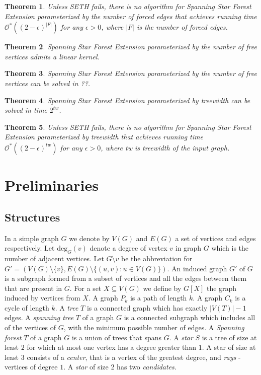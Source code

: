 \documentclass[en]{pracamgr}
\newtheorem{theorem}{Theorem}
\newcommand{\ssfep}{{\sc Spanning Star Forest Extension}}
\newcommand{\degree}[2]{\textrm{deg}_{#1}(#2)}
\begin{document}
\begin{theorem}
	Unless SETH fails, there is no algorithm for \ssfep{} parameterized by the number of forced edges that achieves running time $\mathcal{O}^*((2-\epsilon)^{|F|})$ for any $\epsilon > 0$, where $|F|$ is the number of forced edges.
\end{theorem}

\begin{theorem}
	\ssfep{} parameterized by the number of free vertices admits a linear kernel.
\end{theorem}

\begin{theorem}
	\ssfep{} parameterized by the number of free vertices can be solved in ??.%
\end{theorem}

\begin{theorem}
	\ssfep{} parameterized by treewidth can be solved in time $2^{tw}$.
\end{theorem}

\begin{theorem}
	Unless SETH fails, there is no algorithm for \ssfep{} parameterized by treewidth that achieves running time $\mathcal{O}^*((2-\epsilon)^{tw})$ for any $\epsilon > 0$, where \textup{\textrm{tw}} is treewidth of the input graph.
\end{theorem}

\chapter{Preliminaries}

\section{Structures}

In a simple graph $G$ we denote by $V(G)$ and $E(G)$ a set of vertices and edges respectively. 
Let $\degree{G}{v}$ denote a degree of vertex $v$ in graph $G$ which is the number of adjacent vertices. 
Let $G \setminus v$ be the abbreviation for $G'=(V(G) \setminus \{v\}, E(G) \setminus \{(u,v): u \in V(G)\})$. 
An induced graph $G'$ of $G$ is a subgraph formed from a subset of vertices and all the edges between them that are present in $G$. For a set $X \subseteq V(G)$ we define by $G[X]$ the graph induced by vertices from $X$. 
A graph $P_k$ is a path of length $k$. A graph $C_k$ is a cycle of length $k$. 
A \emph{tree} $T$ is a connected graph which has exactly $|V(T)|-1$ edges. 
A \emph{spanning tree} $T$ of a graph $G$ is a connected subgraph which includes all of the vertices of $G$, with the minimum possible number of edges.
A \emph{Spanning forest} $T$ of a graph $G$ is a union of trees that spans $G$.
A \emph{star} $S$ is a tree of size at least $2$ for which at most one vertex has a degree greater than $1$. 
A star of size at least $3$ consists of a \emph{center}, that is a vertex of the greatest degree, and \emph{rays} - vertices of degree $1$. 
A \emph{star} of size 2 has two \emph{candidates}.
\end{document}
